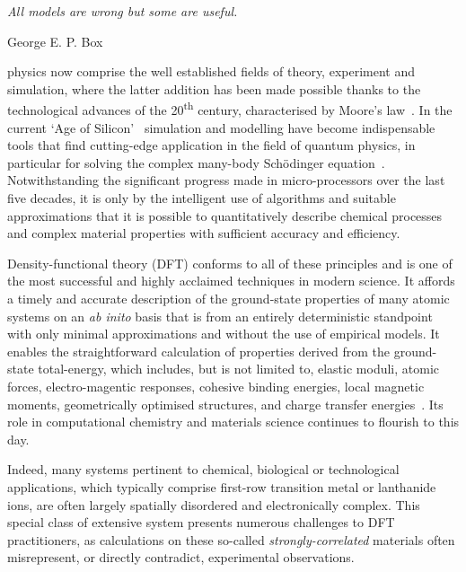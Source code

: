 
 \setlength{}
 \renewcommand{\epigraphflush}{center}

\epigraph{\it All models are wrong but some are useful.}
{George E. P. Box~\cite{doi:10.1080/01621459.1976.10480949}}

physics now comprise the well established 
fields of theory, experiment and simulation, 
where the latter addition 
has been made possible thanks to the 
technological advances 
of the 20\textsuperscript{th} century, 
characterised by Moore's law~\cite{5696765}. 
%
In the current `Age of Silicon'~\cite{sass1998substance} 
simulation and modelling 
have become indispensable tools 
that find cutting-edge application    
in the field of quantum physics, 
in particular for solving the complex 
many-body Sch{\"o}dinger equation~\cite{Trabesinger2012}.
%
Notwithstanding the significant progress made  
in micro-processors over the last five decades, 
it is only by the intelligent use of 
algorithms and suitable approximations  
that it is possible to quantitatively describe   
chemical processes 
and complex material properties  
with sufficient accuracy and efficiency.

Density-functional theory (DFT) conforms 
to all of these principles 
and is one of the most successful 
and highly acclaimed techniques 
in modern science. 
%
It affords a timely and accurate 
description of the ground-state properties 
of many atomic systems on an {\it ab inito} basis 
that is from an entirely deterministic standpoint  
with only minimal approximations 
and without the use of empirical models.
%
It enables the straightforward calculation 
of properties derived from the 
ground-state total-energy, 
which includes, but is not limited to, 
elastic moduli, 
atomic forces, 
electro-magentic responses, 
cohesive binding energies, 
local magnetic moments, 
geometrically optimised structures, 
and charge transfer energies~\cite{martin2004electronic}.
%
Its role in computational chemistry and 
materials science continues to flourish 
to this day.


Indeed, 
many systems pertinent to 
chemical, biological or technological applications, 
which typically comprise first-row transition metal or lanthanide ions, 
are often largely spatially disordered and electronically complex.
%
This special class of extensive system presents 
numerous challenges to DFT practitioners, 
as calculations on these so-called {\it strongly-correlated} materials   
often misrepresent, or directly contradict, experimental observations.
%

